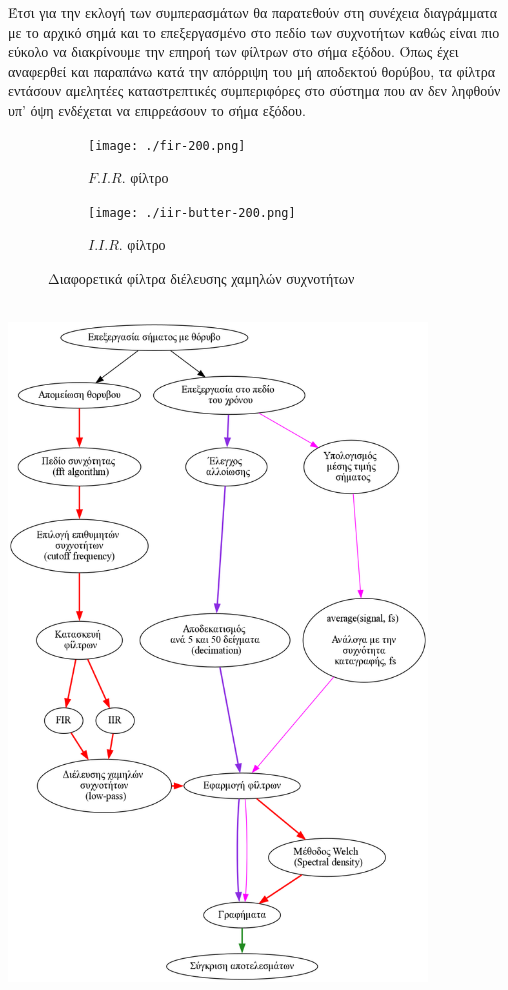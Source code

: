\documentclass[breaklines=true, 12pt]{article}
\begin{document}
Έτσι για την εκλογή των συμπερασμάτων θα παρατεθούν στη συνέχεια διαγράμματα
με το αρχικό σημά και το επεξεργασμένο στο πεδίο των συχνοτήτων καθώς είναι
πιο εύκολο να διακρίνουμε την επηροή των φίλτρων στο σήμα εξόδου. Όπως έχει
αναφερθεί και παραπάνω κατά την απόρριψη του μή αποδεκτού θορύβου, τα φίλτρα
εντάσουν αμελητέες καταστρεπτικές συμπεριφόρες στο σύστημα που αν δεν ληφθούν υπ'
όψη ενδέχεται να επιρρεάσουν το σήμα εξόδου.


\begin{figure}
\centering
\begin{subfigure}{.5\textwidth}
\centering
\texttt{[image: ./fir-200.png]}
\caption{\(F.I.R.\) φίλτρο}
\label{fig:sub1}
\end{subfigure}%
\begin{subfigure}{.5\textwidth}
\centering
\texttt{[image: ./iir-butter-200.png]}
\caption{\(I.I.R.\) φίλτρο}
\label{fig:sub2}
\end{subfigure}
\caption{Διαφορετικά φίλτρα διέλευσης χαμηλών συχνοτήτων}
\label{fig:test}
\end{figure}

\begin{center}
\includegraphics[width=420px,height=699px]{./flowcharts/proc-meth.png}
\end{center}
\clearpage
\end{document}
